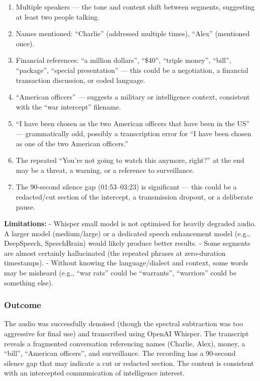 \documentclass[
]{article}
\begin{document}
\begin{enumerate}
\def\labelenumi{\arabic{enumi}.}
\item
  Multiple speakers --- the tone and content shift between segments,
  suggesting at least two people talking.
\item
  Names mentioned: ``Charlie'' (addressed multiple times), ``Alex''
  (mentioned once).
\item
  Financial references: ``a million dollars'', ``\$40'', ``triple
  money'', ``bill'', ``package'', ``special presentation'' --- this
  could be a negotiation, a financial transaction discussion, or coded
  language.
\item
  ``American officers'' --- suggests a military or intelligence context,
  consistent with the ``war intercept'' filename.
\item
  ``I have been chosen as the two American officers that have been in
  the US'' --- grammatically odd, possibly a transcription error for ``I
  have been chosen as one of the two American officers.''
\item
  The repeated ``You're not going to watch this anymore, right?'' at the
  end may be a threat, a warning, or a reference to surveillance.
\item
  The 90-second silence gap (01:53--03:23) is significant --- this could
  be a redacted/cut section of the intercept, a transmission dropout, or
  a deliberate pause.
\end{enumerate}

\textbf{Limitations:} - Whisper small model is not optimised for heavily
degraded audio. A larger model (medium/large) or a dedicated speech
enhancement model (e.g., DeepSpeech, SpeechBrain) would likely produce
better results. - Some segments are almost certainly hallucinated (the
repeated phrases at zero-duration timestamps). - Without knowing the
language/dialect and context, some words may be misheard (e.g., ``war
rats'' could be ``warrants'', ``warriors'' could be something else).

\subsubsection{Outcome}\label{outcome}

The audio was successfully denoised (though the spectral subtraction was
too aggressive for final use) and transcribed using OpenAI Whisper. The
transcript reveals a fragmented conversation referencing names (Charlie,
Alex), money, a ``bill'', ``American officers'', and surveillance. The
recording has a 90-second silence gap that may indicate a cut or
redacted section. The content is consistent with an intercepted
communication of intelligence interest.
\end{document}
